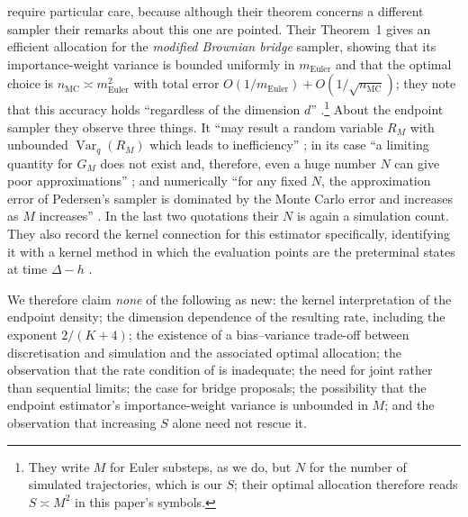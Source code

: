 \documentclass[11pt]{article}
\theoremstyle{definition}
\newcommand{\Var}{\operatorname{Var}}
\newcommand{\nmc}{n_{\mathrm{MC}}}
\newcommand{\meuler}{m_{\mathrm{Euler}}}
\begin{document}
\citet{StramerYan2007a} require particular care, because although their theorem concerns a different sampler their remarks about this one are pointed. Their Theorem~1 gives an efficient allocation for the \emph{modified Brownian bridge} sampler, showing that its importance-weight variance is bounded uniformly in $\meuler$ and that the optimal choice is $\nmc\asymp\meuler^2$ with total error $O(1/\meuler)+O(1/\sqrt{\nmc})$; they note that this accuracy holds ``regardless of the dimension $d$'' \citep[Theorem~1, p.~489]{StramerYan2007a}.\footnote{They write $M$ for Euler substeps, as we do, but $N$ for the number of simulated trajectories, which is our $S$; their optimal allocation therefore reads $S\asymp M^2$ in this paper's symbols.} About the endpoint sampler they observe three things. It ``may result a random variable $R_M$ with unbounded $\Var_q(R_M)$ which leads to inefficiency'' \citep[p.~486]{StramerYan2007a}; in its case ``a limiting quantity for $G_M$ does not exist and, therefore, even a huge number $N$ can give poor approximations'' \citep[p.~490]{StramerYan2007a}; and numerically ``for any fixed $N$, the approximation error of Pedersen's sampler is dominated by the Monte Carlo error and increases as $M$ increases'' \citep[Fig.~2, p.~494]{StramerYan2007a}. In the last two quotations their $N$ is again a simulation count. They also record the kernel connection for this estimator specifically, identifying it with a kernel method in which the evaluation points are the preterminal states at time $\Delta-h$ \citep[p.~486]{StramerYan2007a}.

We therefore claim \emph{none} of the following as new: the kernel interpretation of the endpoint density; the dimension dependence of the resulting rate, including the exponent $2/(K+4)$; the existence of a bias--variance trade-off between discretisation and simulation and the associated optimal allocation; the observation that the rate condition of \citet{BrandtSantaClara2002} is inadequate; the need for joint rather than sequential limits; the case for bridge proposals; the possibility that the endpoint estimator's importance-weight variance is unbounded in $M$; and the observation that increasing $S$ alone need not rescue it.
\end{document}

